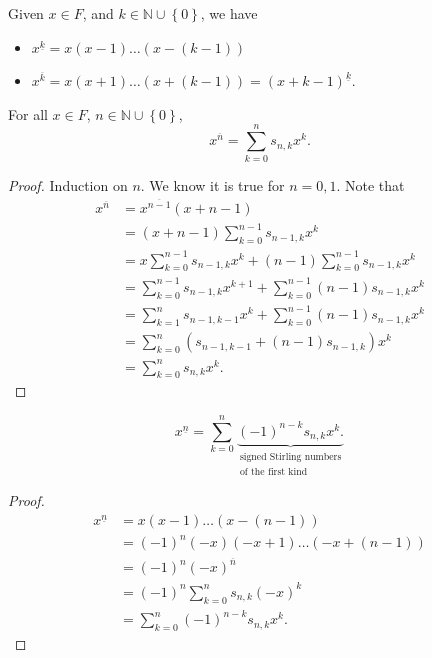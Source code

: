 \begin{notation}
    Given \(x \in F\), and \(k \in \mathbb{N} \cup \left\{ 0 \right\} \), we have 
    \begin{itemize}
        \item \(x^{\underline{k}} = x(x-1)\dots (x-(k-1))\) 
        \item \(x^{\overline{k} } = x(x+1)\dots (x+(k-1)) = (x+k-1)^{\underline{k}}\).  
    \end{itemize}
\end{notation}

\begin{proposition}
    For all \(x \in F\), \(n \in \mathbb{N} \cup \left\{ 0 \right\} \), 
    \[
        x^{\overline{n} }= \sum_{k=0}^n s_{n,k} x^k. 
    \]  
\end{proposition}
\begin{proof}
    Induction on \(n\). We know it is true for \(n=0,1\). Note that 
    \begin{align*}
        x^{\overline{n} } &= x^{\overline{n-1}}(x+n-1) \\
        &= (x+n-1) \sum_{k=0}^{n-1} s_{n-1,k} x^k \\
        &= x \sum_{k=0}^{n-1}s_{n-1,k} x^k + (n-1) \sum_{k=0}^{n-1} s_{n-1, k} x^k \\
        &= \sum_{k=0}^{n-1} s_{n-1,k} x^{k+1} + \sum_{k=0}^{n-1}(n-1)s_{n-1,k}x^k \\
        &= \sum_{k=1}^n s_{n-1, k-1} x^{k} + \sum_{k=0}^{n-1}(n-1)s_{n-1,k}x^k \\
        &= \sum_{k=0}^n \left( s_{n-1,k-1}+(n-1)s_{n-1,k} \right) x^k \\
        &= \sum_{k=0}^n s_{n,k} x^k.          
    \end{align*} 
\end{proof}

\begin{corollary}
    \[
         x^{\underline{n}} = \sum_{k=0}^n \underbrace{(-1)^{n-k} s_{n,k} x^k .}_{\substack{\text{signed Stirling numbers} \\ \text{of the first kind}}}
    \]
\end{corollary}
\begin{proof}
    \begin{align*}
        x^{\underline{n}} &= x(x-1)\dots (x-(n-1)) \\
        &= (-1)^n (-x)(-x+1)\dots (-x+(n-1)) \\
        &=(-1)^n (-x)^{\overline{n} } \\
        &= (-1)^n \sum_{k=0}^n s_{n,k}(-x)^k \\
        &= \sum_{k=0}^n (-1)^{n-k} s_{n,k} x^k. 
    \end{align*}
\end{proof}